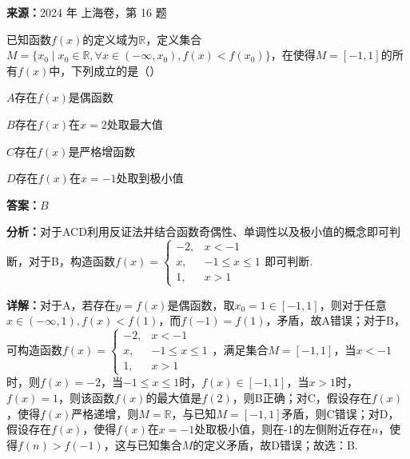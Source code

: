\begin{question}[points=5]
\textbf{来源：}2024 年 上海卷，第 16 题\par
已知函数$f(x)$的定义域为$\mathbb{R}$，定义集合$M=\{x_0\mid x_0\in\mathbb{R},\forall x\in(-\infty,x_0),f(x)<f(x_0)\}$，在使得$M=[-1,1]$的所有$f(x)$中，下列成立的是（\quad\quad）
\begin{choices}
  \item $A$存在$f(x)$是偶函数
  \item $B$存在$f(x)$在$x=2$处取最大值
  \item $C$存在$f(x)$是严格增函数
  \item $D$存在$f(x)$在$x=-1$处取到极小值
\end{choices}
\begin{solution}
\textbf{答案：}$B$

\textbf{分析：}对于ACD利用反证法并结合函数奇偶性、单调性以及极小值的概念即可判断，对于B，构造函数$f(x)=\begin{cases} -2, & x<-1 \\ x, & -1\le x\le1 \\ 1, & x>1 \end{cases}$即可判断.

\textbf{详解：}对于A，若存在$y=f(x)$是偶函数，取$x_0=1\in[-1,1]$，则对于任意$x\in(-\infty,1),f(x)<f(1)$，而$f(-1)=f(1)$，矛盾，故A错误；对于B，可构造函数$f(x)=\begin{cases} -2, & x<-1 \\ x, & -1\le x\le1 \\ 1, & x>1 \end{cases}$，满足集合$M=[-1,1]$，当$x<-1$时，则$f(x)=-2$，当$-1\le x\le1$时，$f(x)\in[-1,1]$，当$x>1$时，$f(x)=1$，则该函数$f(x)$的最大值是$f(2)$，则B正确；对C，假设存在$f(x)$，使得$f(x)$严格递增，则$M=\mathbb{R}$，与已知$M=[-1,1]$矛盾，则C错误；对D，假设存在$f(x)$，使得$f(x)$在$x=-1$处取极小值，则在-1的左侧附近存在$n$，使得$f(n)>f(-1)$，这与已知集合$M$的定义矛盾，故D错误；故选：B.
\end{solution}
\end{question}

